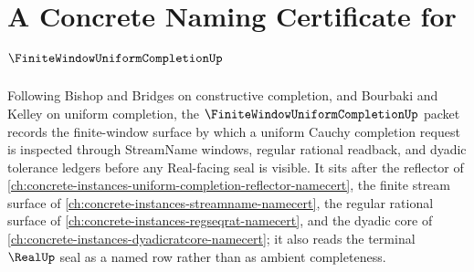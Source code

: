 \chapter{A Concrete Naming Certificate for $\FiniteWindowUniformCompletionUp$}
\label{ch:concrete-instances-finite-window-uniform-completion-namecert}

Following Bishop and Bridges on constructive completion, and Bourbaki and Kelley on uniform completion, the $\FiniteWindowUniformCompletionUp$ packet records the finite-window surface by which a uniform Cauchy completion request is inspected through StreamName windows, regular rational readback, and dyadic tolerance ledgers before any Real-facing seal is visible. It sits after the reflector of \autoref{ch:concrete-instances-uniform-completion-reflector-namecert}, the finite stream surface of \autoref{ch:concrete-instances-streamname-namecert}, the regular rational surface of \autoref{ch:concrete-instances-regseqrat-namecert}, and the dyadic core of \autoref{ch:concrete-instances-dyadicratcore-namecert}; it also reads the terminal $\RealUp$ seal as a named row rather than as ambient completeness.

